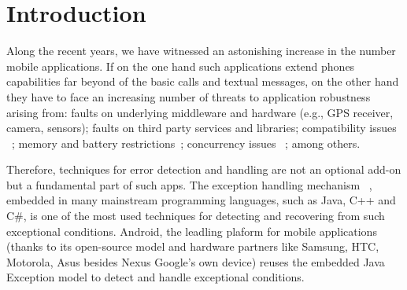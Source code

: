 \documentclass[conference]{IEEEtran}
\begin{document}



\section{Introduction}

Along the recent years, we have witnessed an astonishing increase in the number 
mobile applications. If on the one hand such applications extend phones capabilities 
far beyond of the basic calls and textual messages, on the other hand
they have to face an increasing number of threats to application robustness
 arising from: faults on underlying middleware and hardware (e.g., GPS receiver, camera, sensors);
faults on third party services and libraries; compatibility issues ~\cite{McDon13}; 
 memory and battery restrictions~\cite{Zhang12}; concurrency issues ~\cite{ama2012}; among others. 

Therefore, techniques for error detection and handling are not  an optional add-on but a 
fundamental part of such apps. The exception handling mechanism ~\cite{goodenough1975exception},
embedded in many mainstream programming languages, such as Java, C++ and C\#,
 is one of the most used techniques for detecting and recovering from such exceptional conditions. 
Android, the leadling plaform for mobile applications~\cite{gartner} (thanks to its open-source 
model and hardware partners like Samsung, HTC, Motorola, Asus besides Nexus Google's
 own device)  reuses the embedded Java Exception model to detect and handle 
 exceptional conditions.
\end{document}
